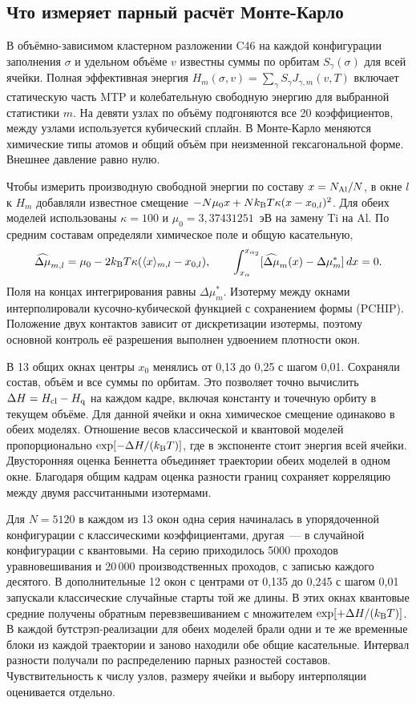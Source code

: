 \documentclass[11pt,a4paper]{article}
\begin{document}
\subsection*{Что измеряет парный расчёт Монте-Карло}

В объёмно-зависимом кластерном разложении C46 на каждой конфигурации
заполнения \(\sigma\) и удельном объёме \(v\) известны суммы по орбитам
\(S_\gamma(\sigma)\) для всей ячейки. Полная эффективная энергия
\(H_m(\sigma,v)=\sum_\gamma S_\gamma J_{\gamma,m}(v,T)\) включает
статическую часть MTP и колебательную свободную энергию для выбранной
статистики \(m\). На девяти узлах по объёму подгоняются все 20
коэффициентов, между узлами используется кубический сплайн.
В Монте-Карло меняются химические типы атомов и общий объём
при неизменной гексагональной форме. Внешнее давление равно нулю.

Чтобы измерить производную свободной энергии по составу \(x=N_{\rm Al}/N\),
в окне \(l\) к \(H_m\) добавляли известное смещение
\(-N\mu_0 x+Nk_{\rm B}T\kappa(x-x_{0,l})^2\).
Для обеих моделей использованы \(\kappa=100\) и
\(\mu_0=3{,}37431251\)~эВ на замену Ti на Al. По средним составам
определяли химическое поле и общую касательную,
\[
 \widehat{\Delta\mu}_{m,l}
 =\mu_0-2k_{\rm B}T\kappa(\langle x\rangle_{m,l}-x_{0,l}),\qquad
 \int_{x_\alpha}^{x_{\alpha_2}}
 [\widehat{\Delta\mu}_{m}(x)-\Delta\mu^*_m]\,dx=0 .
\]
Поля на концах интегрирования равны \(\Delta\mu_m^*\). Изотерму между
окнами интерполировали кусочно-кубической функцией с сохранением формы
(PCHIP). Положение двух контактов зависит от дискретизации изотермы,
поэтому основной контроль её разрешения выполнен удвоением плотности окон.

В 13 общих окнах центры \(x_0\) менялись от 0,13 до 0,25 с шагом
0,01. Сохраняли состав, объём и все суммы по орбитам. Это позволяет
точно вычислить \(\Delta H=H_{\rm cl}-H_{\rm q}\) на каждом кадре,
включая константу и точечную орбиту в текущем объёме.
Для данной ячейки и окна химическое смещение одинаково в обеих моделях.
Отношение весов классической и квантовой моделей пропорционально
\(\exp[-\Delta H/(k_{\rm B}T)]\), где в экспоненте стоит энергия
всей ячейки. Двусторонняя оценка Беннетта объединяет траектории
обеих моделей в одном окне. Благодаря общим кадрам оценка разности
границ сохраняет корреляцию между двумя рассчитанными изотермами.

Для \(N=5120\) в каждом из 13 окон одна серия начиналась в
упорядоченной конфигурации с классическими коэффициентами, другая~---
в случайной конфигурации с квантовыми. На серию приходилось 5000
проходов уравновешивания и 20\,000 производственных проходов, с
записью каждого десятого. В дополнительные 12 окон с центрами от
0,135 до 0,245 с шагом 0,01 запускали классические случайные старты
той же длины. В этих окнах квантовые средние получены обратным
перевзвешиванием с множителем \(\exp[+\Delta H/(k_{\rm B}T)]\).
В каждой бутстрэп-реализации для обеих моделей брали одни и те же
временные блоки из каждой траектории и заново находили обе общие
касательные. Интервал разности получали по распределению парных
разностей составов. Чувствительность к числу узлов, размеру ячейки
и выбору интерполяции оценивается отдельно.
\end{document}
